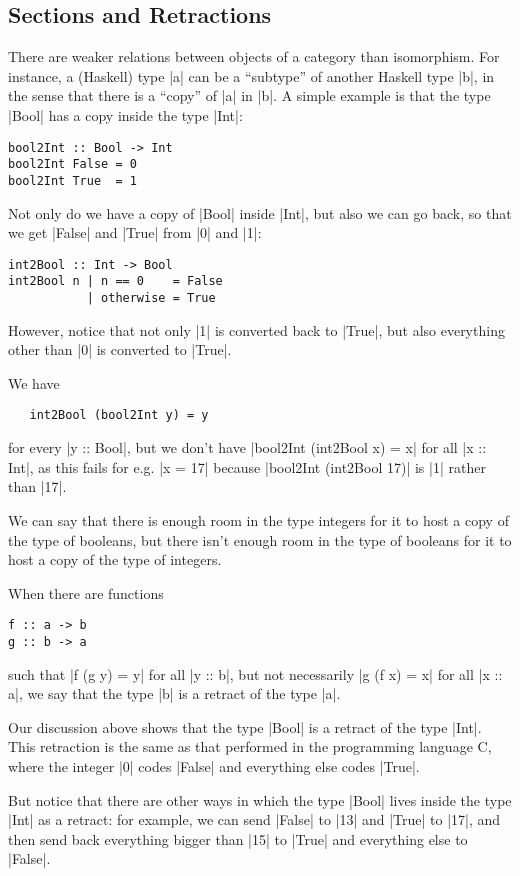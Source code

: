 \documentclass[a4paper,10pt]{scrartcl}
\theoremstyle{plain}
\theoremstyle{definition}
\begin{document}
\subsection{Sections and Retractions}
\label{sec:sections}

There are weaker relations between objects of a category than isomorphism.
For instance, a (Haskell) type |a| can be a ``subtype'' of another Haskell type |b|, in the sense that there is a ``copy'' of |a| in |b|.
A simple example is that the type |Bool| has a copy inside the type |Int|:
\begin{lstlisting}
bool2Int :: Bool -> Int
bool2Int False = 0
bool2Int True  = 1
\end{lstlisting}    

Not only do we have a copy of |Bool| inside |Int|, but also we can go back, so that we get |False| and |True| from |0| and |1|:
\begin{lstlisting}
int2Bool :: Int -> Bool
int2Bool n | n == 0    = False
           | otherwise = True
\end{lstlisting}
However, notice that not only |1| is converted back to |True|, but also everything other than |0| is converted to |True|.

We have
\begin{lstlisting}
   int2Bool (bool2Int y) = y
\end{lstlisting}
for every |y :: Bool|, but we don't have |bool2Int (int2Bool x) = x| for all |x :: Int|, as this fails for e.g. |x = 17| because |bool2Int (int2Bool 17)| is |1| rather than |17|.

We can say that there is enough room in the type integers for it to host a copy of the type of booleans, but there isn't enough room in the type of booleans for it to host a copy of the type of integers.

When there are functions
\begin{lstlisting}
f :: a -> b
g :: b -> a
\end{lstlisting}
such that |f (g y) = y| for all |y :: b|, but not necessarily |g (f x) = x| for all |x :: a|, we say that the type |b| is a retract of the type |a|.

Our discussion above shows that the type |Bool| is a retract of the type |Int|. This retraction is the same as that performed in the programming language C, where the integer |0| codes |False| and everything else codes |True|.

But notice that there are other ways in which the type |Bool| lives inside the type |Int| as a retract: for example, we can send |False| to |13| and |True| to |17|, and then send back everything bigger than |15| to |True| and everything else to |False|.
\end{document}
